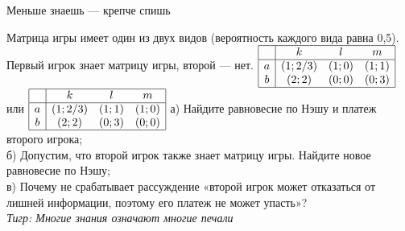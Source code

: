 \begin{problem}
 Меньше знаешь — крепче спишь\par
Матрица игры имеет один из двух видов (вероятность каждого вида равна 0,5). Первый игрок знает матрицу игры, второй — нет.
 $\begin{array}{|c|ccc|}  \hline {} & {k} & {l} & {m} \\  \hline {a} & {\left(1;{2\mathord{\left/ {\vphantom {2 3}} \right. \kern-\nulldelimiterspace} 3} \right)} & {\left(1;0\right)} & {\left(1;1\right)} \\ {b} & {\left(2;2\right)} & {\left(0;0\right)} & {\left(0;3\right)} \\  \hline  \end{array}$  или  $\begin{array}{|c|ccc|}  \hline {} & {k} & {l} & {m} \\  \hline {a} & {\left(1;{2\mathord{\left/ {\vphantom {2 3}} \right. \kern-\nulldelimiterspace} 3} \right)} & {\left(1;1\right)} & {\left(1;0\right)} \\ {b} & {\left(2;2\right)} & {\left(0;3\right)} & {\left(0;0\right)} \\  \hline  \end{array}$
а)      Найдите равновесие по Нэшу и платеж второго игрока;\\
б)      Допустим, что второй игрок также знает матрицу игры. Найдите новое равновесие по Нэшу;\\
в)      Почему не срабатывает рассуждение «второй игрок может отказаться от лишней информации,  поэтому его платеж не может упасть»?\\
{\it Тигр: Многие знания означают многие печали}



\begin{sol}

\end{sol}
\end{problem}






